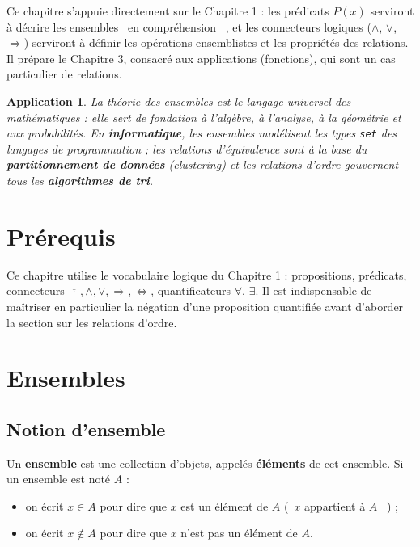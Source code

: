 \documentclass[a4paper,12pt,openany]{book}
\providecommand{\og}{\guillemotleft~}
\providecommand{\fg}{\ifhmode~\fi\guillemotright}
\newtheorem{application}{Application}[section]
\begin{document}
Ce chapitre s'appuie directement sur le Chapitre 1 : les prédicats
$P(x)$ serviront à décrire les ensembles \og en compréhension \fg, et les
connecteurs logiques ($\wedge$, $\vee$, $\Rightarrow$) serviront à définir les
opérations ensemblistes et les propriétés des relations. Il prépare le
Chapitre 3, consacré aux applications (fonctions), qui sont un cas particulier
de relations.

\begin{application}
La théorie des ensembles est le langage universel des mathématiques : elle
sert de fondation à l'algèbre, à l'analyse, à la géométrie et aux
probabilités. En \textbf{informatique}, les ensembles modélisent les types
\texttt{set} des langages de programmation ; les relations d'équivalence
sont à la base du \textbf{partitionnement de données} (clustering) et les
relations d'ordre gouvernent tous les \textbf{algorithmes de tri}.
\end{application}

\section{Prérequis}

Ce chapitre utilise le vocabulaire logique du Chapitre 1 : propositions,
prédicats, connecteurs $\overline{\ \cdot\ }, \wedge, \vee, \Rightarrow,
\Leftrightarrow$, quantificateurs $\forall$, $\exists$. Il est indispensable
de maîtriser en particulier la négation d'une proposition quantifiée avant
d'aborder la section sur les relations d'ordre.

\section{Ensembles}

\subsection{Notion d'ensemble}

\begin{definition}
Un \textbf{ensemble} est une collection d'objets, appelés \textbf{éléments}
de cet ensemble. Si un ensemble est noté $A$ :
\begin{itemize}
  \item on écrit $x \in A$ pour dire que $x$ est un élément de $A$ (\og $x$
  appartient à $A$ \fg) ;
  \item on écrit $x \notin A$ pour dire que $x$ n'est pas un élément de $A$.
\end{itemize}
\end{definition}
\end{document}
